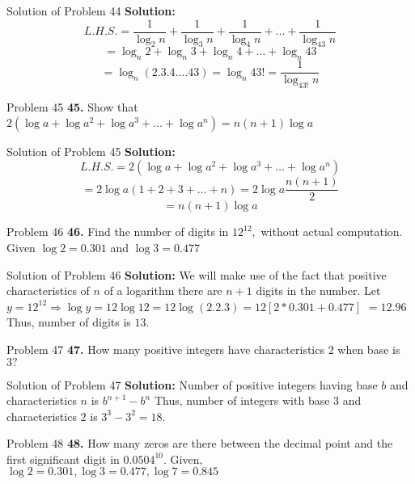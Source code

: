 \documentclass[aspectratio=1610,8pt]{beamer}
\begin{document}
\begin{frame}{Solution of Problem 44}
  \textbf{Solution:} $$L.H.S. = \frac{1}{\log_2n} + \frac{1}{\log_3n} + \frac{1}{\log_4n} + \ldots + \frac{1}{\log_{43}n}$$
  $$= \log_n2 + \log_n3 + \log_n4 + \ldots + \log_n43$$
  $$= \log_n(2.3.4.\ldots 43) = \log_n43! = \frac{1}{\log_{43!}n}$$
\end{frame}
\begin{frame}{Problem 45}
  \textbf{45.} Show that $2(\log a + \log a^2 + \log a^3 + \ldots + \log a^n) = n(n + 1)\log a$
\end{frame}
\begin{frame}{Solution of Problem 45}
  \textbf{Solution:} $$L.H.S. = 2(\log a + \log a^2 + \log a^3 + \ldots + \log a^n)$$
  $$= 2\log a(1 + 2 + 3 + \ldots + n) = 2\log a\frac{n(n + 1)}{2}$$
  $$= n(n +1)\log a$$
\end{frame}
\begin{frame}{Problem 46}
  \textbf{46.} Find the number of digits in $12^{12},$ without actual computation. Given $\log 2 = 0.301$ and $\log 3 = 0.477$
\end{frame}
\begin{frame}{Solution of Problem 46}
  \textbf{Solution:} We will make use of the fact that positive characteristics of $n$ of a logarithm there are $n + 1$ digits in the number.
  \linebreak\linebreak
  Let $y = 12^{12} \Rightarrow \log y = 12\log 12 = 12\log (2.2.3) = 12[2*0.301 + 0.477]$
  \linebreak\linebreak
  $= 12.96$
  \linebreak\linebreak
  Thus, number of digits is $13.$
\end{frame}
\begin{frame}{Problem 47}
  \textbf{47.} How many positive integers have characteristics $2$ when base is $3?$
\end{frame}
\begin{frame}{Solution of Problem 47}
  \textbf{Solution:} Number of positive integers having base $b$ and characteristics $n$ is $b^{n + 1} - b^n$
  \linebreak\linebreak
  Thus, number of integers with base $3$ and characteristics $2$ is $3^3 - 3^2 = 18.$
\end{frame}
\begin{frame}{Problem 48}
  \textbf{48.} How many zeros are there between the decimal point and the first significant digit in $0.0504^{10}.$ Given, $\log 2 = 0.301, \log 3 = 0.477, \log 7 = 0.845$
\end{frame}
\end{document}
